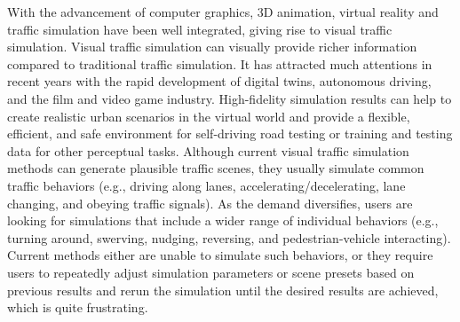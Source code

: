 

With the advancement of computer graphics, 3D animation, virtual reality and traffic simulation have been well integrated, giving rise to visual traffic simulation. Visual traffic simulation can visually provide richer information compared to traditional traffic simulation. It has attracted much attentions in recent years with the rapid development of digital twins, autonomous driving, and the film and video game industry. High-fidelity simulation results can help to create realistic urban scenarios in the virtual world and provide a flexible, efficient, and safe environment for self-driving road testing or training and testing data for other perceptual tasks. Although current visual traffic simulation methods can generate plausible traffic scenes, they usually simulate common traffic behaviors (e.g., driving along lanes, accelerating/decelerating, lane changing, and obeying traffic signals). As the demand diversifies, users are looking for simulations that include a wider range of individual behaviors (e.g., turning around, swerving, nudging, reversing, and pedestrian-vehicle interacting). Current methods either are unable to simulate such behaviors, or they require users to repeatedly adjust simulation parameters or scene presets based on previous results and rerun the simulation until the desired results are achieved, which is quite frustrating. 

